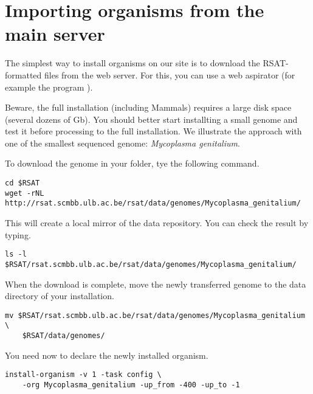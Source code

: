 \section{Importing organisms from the \RSAT main server}

The simplest way to install organisms on our \RSAT site is to download
the RSAT-formatted files from the web server. For this, you can use a
web aspirator (for example the program ). 

Beware, the full installation (including Mammals) requires a large
disk space (several dozens of Gb). You should better start installting
a small genome and test it before processing to the full
installation. We illustrate the approach with one of the smallest
sequenced genome: \textit{Mycoplasma genitalium}.

To download the genome in your \RSAT folder, tye the following
command.

\begin{small}
\begin{verbatim}
cd $RSAT
wget -rNL http://rsat.scmbb.ulb.ac.be/rsat/data/genomes/Mycoplasma_genitalium/
\end{verbatim}
\end{small}

This will create a local mirror of the \RSAT data repository. You can
check the result by typing.

\begin{small}
\begin{verbatim}
ls -l $RSAT/rsat.scmbb.ulb.ac.be/rsat/data/genomes/Mycoplasma_genitalium/
\end{verbatim}
\end{small}

When the download is complete, move the newly transferred genome to
the data directory of your \RSAT installation.

\begin{small}
\begin{verbatim}
mv $RSAT/rsat.scmbb.ulb.ac.be/rsat/data/genomes/Mycoplasma_genitalium \
    $RSAT/data/genomes/
\end{verbatim}
\end{small}

You need now to declare the newly installed organism. 

\begin{small}
\begin{verbatim}
install-organism -v 1 -task config \
    -org Mycoplasma_genitalium -up_from -400 -up_to -1
\end{verbatim}
\end{small}

